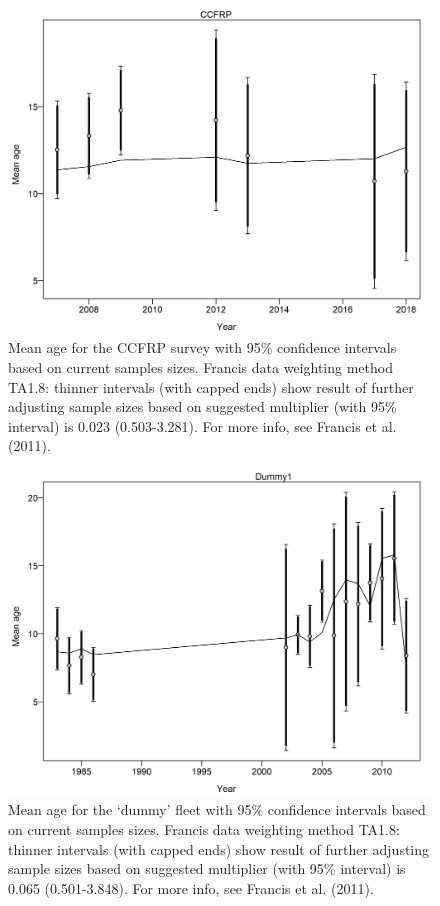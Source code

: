 \documentclass[12pt,]{article}
\begin{document}
\begin{figure}
\centering
\includegraphics{r4ss/plots_mod1/comp_condAALfit_data_weighting_TA1.8_condAgeCCFRP.png}
\caption{Mean age for the CCFRP survey with 95\% confidence intervals
based on current samples sizes. Francis data weighting method TA1.8:
thinner intervals (with capped ends) show result of further adjusting
sample sizes based on suggested multiplier (with 95\% interval) is 0.023
(0.503-3.281). For more info, see Francis et al. (2011).
\label{fig:comp_condAALfit_data_weighting_TA1.8_condAgeCCFRP}}
\end{figure}

\begin{figure}
\centering
\includegraphics{r4ss/plots_mod1/comp_condAALfit_data_weighting_TA1.8_condAgeDummy1.png}
\caption{Mean age for the `dummy' fleet with 95\% confidence intervals
based on current samples sizes. Francis data weighting method TA1.8:
thinner intervals (with capped ends) show result of further adjusting
sample sizes based on suggested multiplier (with 95\% interval) is 0.065
(0.501-3.848). For more info, see Francis et al. (2011).
\label{fig:comp_condAALfit_data_weighting_TA1.8_condAgeDummy1}}
\end{figure}
\end{document}
